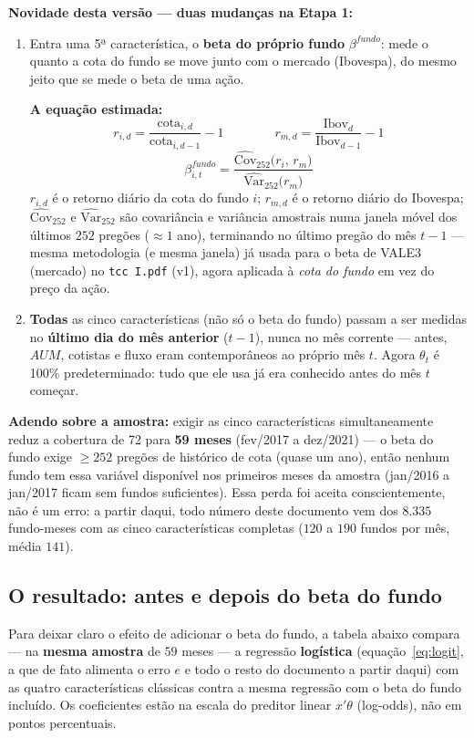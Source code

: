 \documentclass[11pt,a4paper]{article}
\newcommand{\equacao}[0]{\par\vspace{4pt}\noindent\textbf{\color{vermelho}A equação estimada:}\ }
\begin{document}
\textbf{Novidade desta versão --- duas mudanças na Etapa 1:}
\begin{enumerate}[topsep=2pt,itemsep=2pt]
\item[(a)] Entra uma 5ª característica, o \textbf{beta do próprio fundo} $\beta^{fundo}$: mede o
quanto a cota do fundo se move junto com o mercado (Ibovespa), do mesmo jeito que se mede o beta
de uma ação.
\equacao
$$r_{i,d} = \frac{\text{cota}_{i,d}}{\text{cota}_{i,d-1}} - 1 \qquad\qquad
r_{m,d} = \frac{\text{Ibov}_d}{\text{Ibov}_{d-1}} - 1$$
$$\beta^{fundo}_{i,t} = \frac{\widehat{\text{Cov}}_{252}\big(r_i,\,r_m\big)}
{\widehat{\text{Var}}_{252}\big(r_m\big)}$$
$r_{i,d}$ é o retorno diário da cota do fundo $i$; $r_{m,d}$ é o retorno diário do Ibovespa;
$\widehat{\text{Cov}}_{252}$ e $\widehat{\text{Var}}_{252}$ são covariância e variância amostrais
numa janela móvel dos últimos $252$ pregões (${\approx}1$ ano), terminando no último pregão do
mês $t-1$ --- mesma metodologia (e mesma janela) já usada para o beta de VALE3 (mercado) no
\texttt{tcc I.pdf} (v1), agora aplicada à \emph{cota do fundo} em vez do preço da ação.
\item[(b)] \textbf{Todas} as cinco características (não só o beta do fundo) passam a ser medidas
no \textbf{último dia do mês anterior} ($t-1$), nunca no mês corrente --- antes, $AUM$, cotistas
e fluxo eram contemporâneos ao próprio mês $t$. Agora $\theta_t$ é 100\% predeterminado: tudo que
ele usa já era conhecido antes do mês $t$ começar.
\end{enumerate}

\textbf{Adendo sobre a amostra:} exigir as cinco características simultaneamente reduz a
cobertura de 72 para \textbf{59 meses} (fev/2017 a dez/2021) --- o beta do fundo exige
$\geq252$ pregões de histórico de cota (quase um ano), então nenhum fundo tem essa variável
disponível nos primeiros meses da amostra (jan/2016 a jan/2017 ficam sem fundos suficientes).
Essa perda foi aceita conscientemente, não é um erro: a partir daqui, todo número deste
documento vem dos $8.335$ fundo-meses com as cinco características completas ($120$ a $190$
fundos por mês, média $141$).

\subsection{O resultado: antes e depois do beta do fundo}

Para deixar claro o efeito de adicionar o beta do fundo, a tabela abaixo compara --- na
\textbf{mesma amostra} de $59$ meses --- a regressão \textbf{logística} (equação~\eqref{eq:logit},
a que de fato alimenta o erro $e$ e todo o resto do documento a partir daqui) com as quatro
características clássicas contra a mesma regressão com o beta do fundo incluído. Os coeficientes
estão na escala do preditor linear $x'\theta$ (log-odds), não em pontos percentuais.
\end{document}
